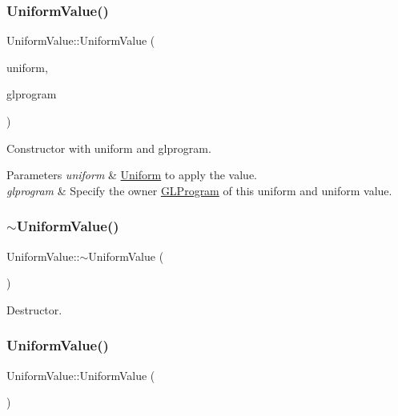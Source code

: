 \subsubsection{\texorpdfstring{Uniform\+Value()}{UniformValue()}\hspace{0.1cm}{\footnotesize\ttfamily [2/4]}}
{\footnotesize\ttfamily Uniform\+Value\+::\+Uniform\+Value (\begin{DoxyParamCaption}\item[{\hyperlink{structUniform}{Uniform} $\ast$}]{uniform,  }\item[{\hyperlink{classGLProgram}{G\+L\+Program} $\ast$}]{glprogram }\end{DoxyParamCaption})}

Constructor with uniform and glprogram. 
\begin{DoxyParams}{Parameters}
{\em uniform} & \hyperlink{structUniform}{Uniform} to apply the value. \\
\hline
{\em glprogram} & Specify the owner \hyperlink{classGLProgram}{G\+L\+Program} of this uniform and uniform value. \\
\hline
\end{DoxyParams}
\mbox{\label{classUniformValue_a85225518894b909a58e7f53715de9419}} 
\subsubsection{\texorpdfstring{$\sim$\+Uniform\+Value()}{~UniformValue()}\hspace{0.1cm}{\footnotesize\ttfamily [1/2]}}
{\footnotesize\ttfamily Uniform\+Value\+::$\sim$\+Uniform\+Value (\begin{DoxyParamCaption}{ }\end{DoxyParamCaption})}

Destructor. \mbox{\label{classUniformValue_a981f70651e0d28ab7bad561370bd5864}} 
\subsubsection{\texorpdfstring{Uniform\+Value()}{UniformValue()}\hspace{0.1cm}{\footnotesize\ttfamily [3/4]}}
{\footnotesize\ttfamily Uniform\+Value\+::\+Uniform\+Value (\begin{DoxyParamCaption}{ }\end{DoxyParamCaption})}

